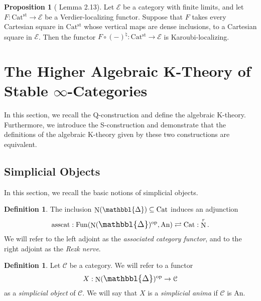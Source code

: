 \documentclass[a4paper,dvipdfmx,11pt,reqno]{amsart}
\DeclareMathOperator{\myop}{op}
\DeclareMathOperator{\N}{N}
\DeclareMathOperator{\Fun}{Fun}
\newcommand{\C}{\mathcal{C}}
\newcommand{\E}{\mathcal{E}}
\DeclareMathOperator{\asscat}{asscat}
\newcommand{\An}{\mathrm{An}}
\newcommand{\Cat}{\mathrm{Cat}}
\newcommand{\Catst}{\mathrm{Cat^{st}}}
\newcommand{\prism}{{\mathlarger{\mathbbl{\Delta}}}}
\theoremstyle{definition}
\newtheorem{definition}[theorem]{Definition}
\newtheorem{proposition}[theorem]{Proposition}
\begin{document}
\begin{proposition}[\cite{HLS23} Lemma 2.13] \label{HLS23.lem.2.13}
  Let $\E$ be a category with finite limits, and let $F : \Catst \to \E$ be a Verdier-localizing functor.
  Suppose that $F$ takes every Cartesian square in $\Catst$ whose vertical maps are dense inclusions, to a Cartesian square in $\E$. 
  Then the functor $F \circ (-)^{\natural} : \Catst \to \E$ is Karoubi-localizing.
\end{proposition}


\section{The Higher Algebraic K-Theory of Stable \texorpdfstring{$\infty$}{infty}-Categories} \label{sec.algebraic_k_theory}

In this section, we recall the Q-construction and define the algebraic K-theory. 
Furthermore, we introduce the S-construction and demonstrate that the definitions of the algebraic K-theory given by these two constructions are equivalent.

\subsection{Simplicial Objects}

In this section, we recall the basic notions of simplicial objects.

\begin{definition}
  The inclusion $\N(\prism) \subseteq \Cat$ induces an adjunction 
  \begin{align*}
    \asscat : \Fun(\N(\prism)^{\myop},\An) \rightleftarrows \Cat : \N^r.
  \end{align*}
  We will refer to the left adjoint as the \textit{associated category functor}, and to the right adjoint as the \textit{Rezk nerve}.
\end{definition}

\begin{definition}
  Let $\C$ be a category.
  We will refer to a functor 
  \begin{align*}
    X : \N(\prism)^{\myop} \to \C
  \end{align*}
  as a \textit{simplicial object} of $\C$.
  We will say that $X$ is a \textit{simplicial anima} if $\C$ is $\An$.
\end{definition}
\end{document}
